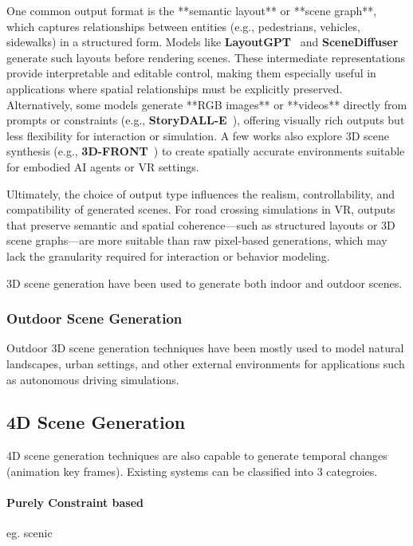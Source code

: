 \documentclass{article}
\begin{document}
One common output format is the **semantic layout** or **scene graph**, which captures relationships between entities (e.g., pedestrians, vehicles, sidewalks) in a structured form. Models like \textbf{LayoutGPT}~\cite{feng2023layoutgpt} and \textbf{SceneDiffuser}~\cite{yang2023scenediffuser} generate such layouts before rendering scenes. These intermediate representations provide interpretable and editable control, making them especially useful in applications where spatial relationships must be explicitly preserved. Alternatively, some models generate **RGB images** or **videos** directly from prompts or constraints (e.g., \textbf{StoryDALL-E}~\cite{storydalle}), offering visually rich outputs but less flexibility for interaction or simulation. A few works also explore 3D scene synthesis (e.g., \textbf{3D-FRONT}~\cite{fu20213dfront}) to create spatially accurate environments suitable for embodied AI agents or VR settings.

Ultimately, the choice of output type influences the realism, controllability, and compatibility of generated scenes. For road crossing simulations in VR, outputs that preserve semantic and spatial coherence—such as structured layouts or 3D scene graphs—are more suitable than raw pixel-based generations, which may lack the granularity required for interaction or behavior modeling.


3D scene generation have been used to generate both indoor and outdoor scenes.


\subsubsection{Outdoor Scene Generation}

Outdoor 3D scene generation techniques have been mostly used to model natural landscapes, urban settings, and other external environments for applications such as autonomous driving simulations.

\subsection{4D Scene Generation}

4D scene generation techniques are also capable to generate temporal changes (animation key frames). Existing systems can be classified into 3 categroies.

\paragraph{Purely Constraint based} eg. scenic
\end{document}
